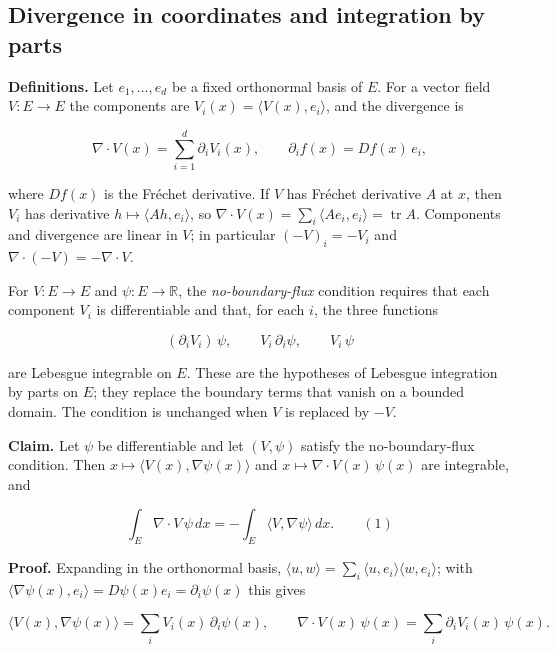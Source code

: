 \documentclass[11pt,a4paper]{report}
\begin{document}
\subsection{\texorpdfstring{Divergence in coordinates and integration by parts}{Divergence in coordinates and integration by parts}}


\textbf{Definitions.} Let \(e_1,\dots,e_d\) be a fixed orthonormal basis of \(E\). For a vector field \(V:E\to E\) the components are \(V_i(x)=\langle V(x),e_i\rangle\), and the divergence is


\[\nabla\cdot V(x)=\sum_{i=1}^d\partial_iV_i(x),\qquad\partial_if(x)=Df(x)\,e_i,\]


where \(Df(x)\) is the Fréchet derivative. If \(V\) has Fréchet derivative \(A\) at \(x\), then \(V_i\) has derivative \(h\mapsto\langle Ah,e_i\rangle\), so \(\nabla\cdot V(x)=\sum_i\langle Ae_i,e_i\rangle=\operatorname{tr}A\). Components and divergence are linear in \(V\); in particular \((-V)_i=-V_i\) and \(\nabla\cdot(-V)=-\nabla\cdot V\).




For \(V:E\to E\) and \(\psi:E\to\mathbb R\), the \emph{no-boundary-flux} condition requires that each component \(V_i\) is differentiable and that, for each \(i\), the three functions


\[(\partial_iV_i)\,\psi,\qquad V_i\,\partial_i\psi,\qquad V_i\,\psi\]


are Lebesgue integrable on \(E\). These are the hypotheses of Lebesgue integration by parts on \(E\); they replace the boundary terms that vanish on a bounded domain. The condition is unchanged when \(V\) is replaced by \(-V\).




\textbf{Claim.} Let \(\psi\) be differentiable and let \((V,\psi)\) satisfy the no-boundary-flux condition. Then \(x\mapsto\langle V(x),\nabla\psi(x)\rangle\) and \(x\mapsto\nabla\cdot V(x)\,\psi(x)\) are integrable, and


\[\int_E\nabla\cdot V\,\psi\,dx=-\int_E\langle V,\nabla\psi\rangle\,dx.\qquad(1)\]


\textbf{Proof.} Expanding in the orthonormal basis, \(\langle u,w\rangle=\sum_i\langle u,e_i\rangle\langle w,e_i\rangle\); with \(\langle\nabla\psi(x),e_i\rangle=D\psi(x)e_i=\partial_i\psi(x)\) this gives


\[\langle V(x),\nabla\psi(x)\rangle=\sum_iV_i(x)\,\partial_i\psi(x),\qquad\nabla\cdot V(x)\,\psi(x)=\sum_i\partial_iV_i(x)\,\psi(x).\]
\end{document}
